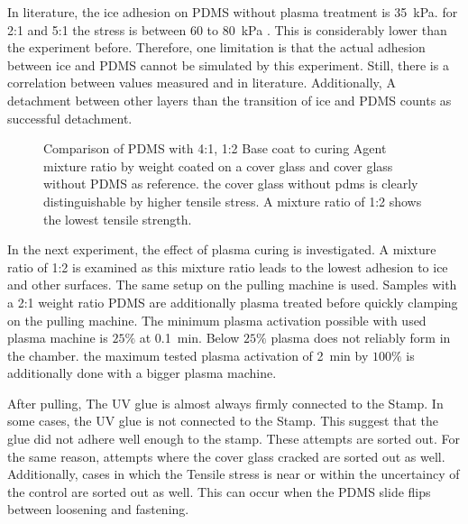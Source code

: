 In literature, the ice adhesion on PDMS without plasma treatment is \SI{35}{\kilo\pascal}. for 2:1 and 5:1 the stress is between $60$ to \SI{80}{\kilo\pascal} \cite{IbanezIbanez.2022}. This is considerably lower than the experiment before. Therefore, one limitation is that the actual adhesion between ice and PDMS cannot be simulated by this experiment. Still, there is a correlation between values measured and in literature. Additionally, A detachment between other layers than the transition of ice and PDMS counts as successful detachment. 

\begin{figure}[hbt!]
	\centering	
	
	\caption{Comparison of PDMS with 4:1, 1:2 Base coat to curing Agent mixture ratio by weight coated on a cover glass and cover glass without PDMS as reference. the cover glass without pdms is clearly distinguishable by higher tensile stress. A mixture ratio of 1:2 shows the lowest tensile strength.}
	\label{fig:vgl4:1zu1:2zuGlas}
\end{figure}

\begin{comment}
\begin{figure}[hbt!]
	\centering
	\texttt{[image: exampleZugversuchUntereHälfte]}
	\label{fig:ExampleSampleWithPDMS
	\caption{Glass piece }
\end{figure}
\end{comment}

In the next experiment, the effect of plasma curing is investigated. A mixture ratio of 1:2 is examined as this mixture ratio leads to the lowest adhesion to ice and other surfaces. The same setup on the pulling machine is used. Samples with a 2:1 weight ratio PDMS are additionally plasma treated before quickly clamping on the pulling machine. The minimum plasma activation possible with used plasma machine is $25\%$ at \SI{0.1}{\minute}. Below $25\%$ plasma does not reliably form in the chamber. the maximum tested plasma activation of \SI{2}{\minute} by $100\%$ is additionally done with a bigger plasma machine.

After pulling, The UV glue is almost always firmly connected to the Stamp. In some cases, the UV glue is not connected to the Stamp. This suggest that the glue did not adhere well enough to the stamp. These attempts are sorted out. For the same reason, attempts where the cover glass cracked are sorted out as well. Additionally, cases in which the Tensile stress is near or within the uncertaincy of the control are sorted out as well. This can occur when the PDMS slide flips between loosening and fastening.

